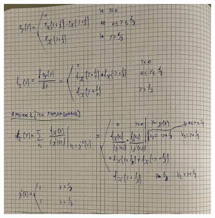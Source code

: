 \documentclass{article}
\begin{document}
\begin{figure}[H]
\centering
\includegraphics[scale=0.10]{ese/29a.jpeg}
\end{figure}
\end{document}
